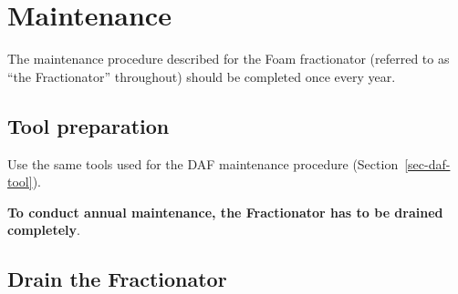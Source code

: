 \documentclass[
  12pt,
]{report}
\begin{document}
\hypertarget{sec-frac-main}{%
\section{Maintenance}\label{sec-frac-main}}

{The maintenance procedure described for the Foam fractionator (referred
to as ``the Fractionator'' throughout) should be completed once every
year}.

\hypertarget{tool-preparation-1}{%
\subsection{Tool preparation}\label{tool-preparation-1}}

Use the same tools used for the DAF maintenance procedure
(Section~\ref{sec-daf-tool}).

\textbf{To conduct annual maintenance, the Fractionator has to be
drained completely}.

\hypertarget{sec-drain-frac}{%
\subsection{Drain the Fractionator}\label{sec-drain-frac}}
\end{document}
